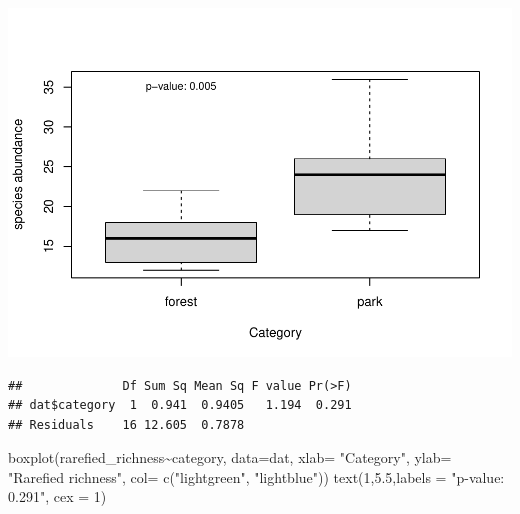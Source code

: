 \documentclass[
]{article}
\newenvironment{Shaded}{\begin{snugshade}}{\end{snugshade}}
\newcommand{\AttributeTok}[1]{\textcolor[rgb]{0.77,0.63,0.00}{#1}}
\newcommand{\CommentTok}[1]{\textcolor[rgb]{0.56,0.35,0.01}{\textit{#1}}}
\newcommand{\DecValTok}[1]{\textcolor[rgb]{0.00,0.00,0.81}{#1}}
\newcommand{\FloatTok}[1]{\textcolor[rgb]{0.00,0.00,0.81}{#1}}
\newcommand{\FunctionTok}[1]{\textcolor[rgb]{0.00,0.00,0.00}{#1}}
\newcommand{\NormalTok}[1]{#1}
\newcommand{\OtherTok}[1]{\textcolor[rgb]{0.56,0.35,0.01}{#1}}
\newcommand{\SpecialCharTok}[1]{\textcolor[rgb]{0.00,0.00,0.00}{#1}}
\newcommand{\StringTok}[1]{\textcolor[rgb]{0.31,0.60,0.02}{#1}}
\begin{document}
\includegraphics{birdsdataanalysis_files/figure-latex/unnamed-chunk-5-5.pdf}

\begin{Shaded}
\end{Shaded}

\begin{verbatim}
##              Df Sum Sq Mean Sq F value Pr(>F)
## dat$category  1  0.941  0.9405   1.194  0.291
## Residuals    16 12.605  0.7878
\end{verbatim}

\begin{Shaded}
\begin{Highlighting}[]
\FunctionTok{boxplot}\NormalTok{(rarefied\_richness}\SpecialCharTok{\textasciitilde{}}\NormalTok{category, }\AttributeTok{data=}\NormalTok{dat, }\AttributeTok{xlab=} \StringTok{"Category"}\NormalTok{, }\AttributeTok{ylab=} \StringTok{"Rarefied richness"}\NormalTok{, }\AttributeTok{col=} \FunctionTok{c}\NormalTok{(}\StringTok{"lightgreen"}\NormalTok{, }\StringTok{"lightblue"}\NormalTok{))}
\FunctionTok{text}\NormalTok{(}\DecValTok{1}\NormalTok{,}\FloatTok{5.5}\NormalTok{,}\AttributeTok{labels =} \StringTok{"p{-}value: 0.291"}\NormalTok{, }\AttributeTok{cex =} \DecValTok{1}\NormalTok{)}
\end{Highlighting}
\end{Shaded}
\end{document}
